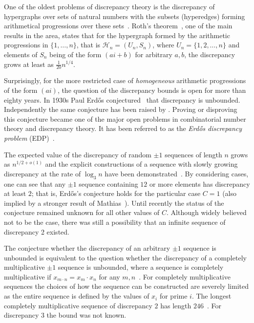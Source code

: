 \documentclass{article} \usepackage[utf8]{inputenc}
\begin{document}
One of the oldest problems of discrepancy theory is the 
discrepancy of hypergraphs over sets of natural numbers with the  subsets
(hyperedges) forming arithmetical progressions over these sets~\cite{MS96}. 
 Roth's theorem~\cite{Roth64}, one of the main results in the area, states that
for the hypergraph formed by the arithmetic progressions in $\{1,\dots, n\}$, that is
$\mathcal{H}_n=(U_n, S_n)$, where $U_n = \{1,2, \ldots, n\}$ and
elements of $S_n$ being of the form $(ai+b)$ for arbitrary $a, b$,
the discrepancy grows at least as $\frac{1}{20}n^{1/4}$.

\vspace*{1pt}

Surprisingly, for the more restricted case of \emph{homogeneous} arithmetic progressions of the form
$(ai)$, the question of the discrepancy bounds is open for more than eighty years.   
In 1930s Paul Erd\H{o}s conjectured~\cite{Unsolved} that
discrepancy is unbounded. Independently the same conjecture has been raised by 
\cite{chudakov}.
Proving or  disproving this conjecture became one of the major open problems in
combinatorial number theory and discrepancy theory. It has been referred to as the
\emph{Erd\H{o}s discrepancy problem} (EDP)~\cite{Beck,BeckSos,NiTa}.


The  expected value of the discrepancy of 
random  $\pm 1$ sequences of length $n$ grows as
$n^{1/2+o(1)}$ and the explicit constructions of a sequence with slowly growing
discrepancy at the rate of $\log_3 n$ have been demonstrated~\cite{gowers,BCC10}. 
By considering cases, one can see  that
any $\pm1$ sequence containing $12$ or more elements has discrepancy at least $2$;
that
is, Erd\H{o}s's conjecture holds for the particular case $C=1$ 
(also implied by a stronger result of Mathias~). 
Until recently the status of the conjecture remained unknown for all other
values of $C$.  Although widely believed not to be the case, there was still a
possibility that an infinite sequence of discrepancy 2 existed. 

The conjecture whether the discrepancy of an arbitrary $\pm1$ sequence is
unbounded is equivalent to the question whether the discrepancy of a completely
multiplicative $\pm1$ sequence is unbounded, where a sequence is completely
multiplicative if $x_{m\cdot n} = x_m\cdot x_n$ for any $m,n$~\cite{Unsolved}.
For completely multiplicative sequences the choices of how the sequence can be
constructed are severely limited as the entire sequence is defined by the values of
$x_i$ for prime $i$. The longest completely multiplicative sequence of
discrepancy $2$ has length $246$~\cite{Polymath2}.  For discrepancy $3$ the
bound was not known.
\end{document}
